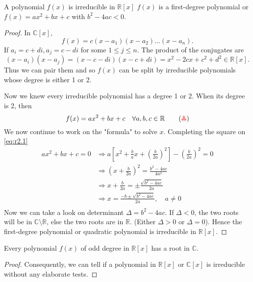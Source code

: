 \begin{theorem}
    A polynomial $f(x)$ is irreducible in $\mathbb{R}[x]$  $f(x)$ is a 
    first-degree polynomial or $f(x) = ax^2 + bx + c$ with $b^2 - 4ac < 0$.
\end{theorem}
\begin{proof}
    In $\mathbb{C}[x]$,
    \[
        f(x) = c(x - a_1)(x-a_2)\ldots (x-a_n).
    \]
    If $a_i = c + di, a_j = c-di$ for some $1 \leq j \leq n$. The product of the conjugates are 
    \[
        (x - a_i)(x - a_j) = (x - c -di)(x - c + di) = x^2 -2cx + c^2 + d^2 \in \mathbb{R}[x].
    \]
    Thus we can pair them and so $f(x)$ can be split by irreducible polynomials whose degree is either 
    1 or 2.

    Now we knew every irreducible polynomial has a degree 1 or 2. When its degree is 2, then 
    \[
        f(x) = ax^2 + bx + c \quad \forall a,b,c \in \mathbb{R} \label{eq:r2.1} \tag{{\color{myred} $\clubsuit$}}
    \]
    We now continue to work on the "formula" to solve $x$. Completing the square on \eqref{eq:r2.1}
    \begin{align*}
        ax^2 + bx + c = 0 &\Rightarrow a \left[ x^2 + \frac{b}{a}x + \left(\frac{b}{2a} \right)^2 \right] - \left(\frac{b}{2a} \right)^2 = 0\\
        &\Rightarrow \left(x + \frac{b}{2a} \right)^2 = \frac{b^2 - 4ac}{4a^2}\\[0.35em]
        &\Rightarrow x + \frac{b}{2a} = \pm \frac{\sqrt{b^2 - 4ac}}{2a}\\[0.35em]
        &\Rightarrow x = \frac{-b \pm \sqrt{b^2 - 4ac}}{2a}, \quad a \neq 0\\
    \end{align*}
    Now we can take a look on determinant $\Delta = b^2 - 4ac$. If $\Delta < 0$, the two roots 
    will be in $\mathbb{C} \setminus \mathbb{R}$, else the two roots are in $\mathbb{R}$. (Either $\Delta > 0$ or 
    $\Delta = 0$). Hence the first-degree polynomial or quadratic polynomial is irreducible in $\mathbb{R}[x]$.
\end{proof}

\begin{corollary}
    Every polynomial $f(x)$ of odd degree in $\mathbb{R}[x]$ has a root in $\mathbb{C}$.
\end{corollary}
\begin{proof}
    Consequently, we can tell if a polynomial in $\mathbb{R}[x]$ or $\mathbb{C}[x]$ is irreducible without any elaborate 
    tests.
\end{proof}

